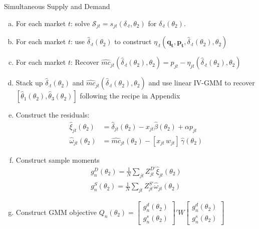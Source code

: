 \documentclass[xcolor=pdftex,dvipsnames,table,mathserif,aspectratio=169]{beamer}
\begin{document}
\begin{frame}{Simultaneous Supply and Demand}
\tiny
\begin{enumerate}[(a)]
\item For each market $t$: solve $\mathcal{S}_{jt} = s_{jt}(\delta_{\cdot t},\theta_2)$ for $\widehat{\delta}_{\cdot t}(\theta_2)$.
\item For each market $t$: use $\widehat{\delta}_{\cdot t}(\theta_2)$ to construct $\eta_{\cdot 
t}(\mathbf{q_t},\mathbf{p_t},\widehat{\delta}_{\cdot t}(\theta_2),\theta_2)$
\item For each market $t$: Recover $\widehat{mc}_{jt}(\widehat{\delta}_{\cdot t}(\theta_2),\theta_2) = p_{jt} - \eta_{jt}(\widehat{\delta}_{\cdot t}(\theta_2),\theta_2)$
\item Stack up $\widehat{\delta}_{\cdot t}(\theta_2)$ and $\widehat{mc}_{jt}(\widehat{\delta}_{\cdot t}(\theta_2),\theta_2)$ and use linear IV-GMM to recover $[\widehat{\theta}_1(\theta_2), \widehat{\theta}_3(\theta_2) ]$ following the recipe in Appendix
\item Construct the residuals:
\begin{align*}
\nonumber    \widehat{\xi}_{jt}(\theta_2) &= \widehat{\delta}_{jt}(\theta_2) -  x_{jt} \widehat{\beta}(\theta_2) + \alpha p_{jt}\\
    \widehat{\omega}_{jt}(\theta_2) &= \widehat{mc}_{jt}(\theta_2) -  [x_{jt}\, w_{jt}]\, \widehat{\gamma}(\theta_2)
\end{align*}
\item Construct sample moments
\begin{align*}
\nonumber g_n^D(\theta_2)=\frac{1}{N} \sum_{jt} Z_{jt}^{D\prime} \widehat{\xi}_{jt}(\theta_2)\\
 g_n^S(\theta_2)=\frac{1}{N} \sum_{jt} Z_{jt}^{S \prime} \widehat{\omega}_{jt}(\theta_2)
\end{align*}
\item Construct GMM objective $Q_n(\theta_2)= \left[ {\begin{array}{c} g_n^d(\theta_2) \\ g_n^s(\theta_2) \end{array} } \right]' W  \left[ {\begin{array}{c} g_n^d(\theta_2) \\ g_n^s(\theta_2) \end{array} } \right] $
\end{enumerate}
\end{frame}
\end{document}
